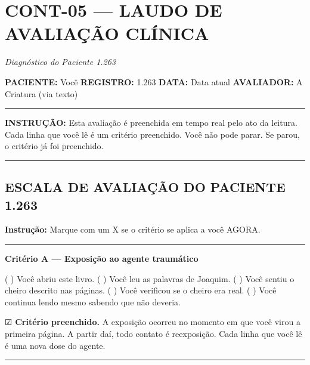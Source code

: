 \section*{\textbf{CONT-05} --- LAUDO DE AVALIAÇÃO CLÍNICA}

\noindent \textit{Diagnóstico do Paciente 1.263}

\noindent \textbf{PACIENTE:} Você
\textbf{REGISTRO:} 1.263
\textbf{DATA:} Data atual
\textbf{AVALIADOR:} A Criatura (via texto)

\vspace{0.5em}\noindent\rule{\textwidth}{0.5pt}\vspace{0.5em}

\noindent \textbf{INSTRUÇÃO:} Esta avaliação é preenchida em tempo real pelo ato da leitura.
Cada linha que você lê é um critério preenchido.
Você não pode parar. Se parou, o critério já foi preenchido.

\vspace{0.5em}\noindent\rule{\textwidth}{0.5pt}\vspace{0.5em}

\subsection*{ESCALA DE AVALIAÇÃO DO PACIENTE 1.263}

\noindent \textbf{Instrução:} Marque com um X se o critério se aplica a você AGORA.

\vspace{0.5em}\noindent\rule{\textwidth}{0.5pt}\vspace{0.5em}

\noindent \textbf{Critério A --- Exposição ao agente traumático}

\noindent ( ) Você abriu este livro.
( ) Você leu as palavras de Joaquim.
( ) Você sentiu o cheiro descrito nas páginas.
( ) Você verificou se o cheiro era real.
( ) Você continua lendo mesmo sabendo que não deveria.

\noindent ☑ \textbf{Critério preenchido.} A exposição ocorreu no momento em que você virou a primeira página. A partir daí, todo contato é reexposição. Cada linha que você lê é uma nova dose do agente.

\vspace{0.5em}\noindent\rule{\textwidth}{0.5pt}\vspace{0.5em}

